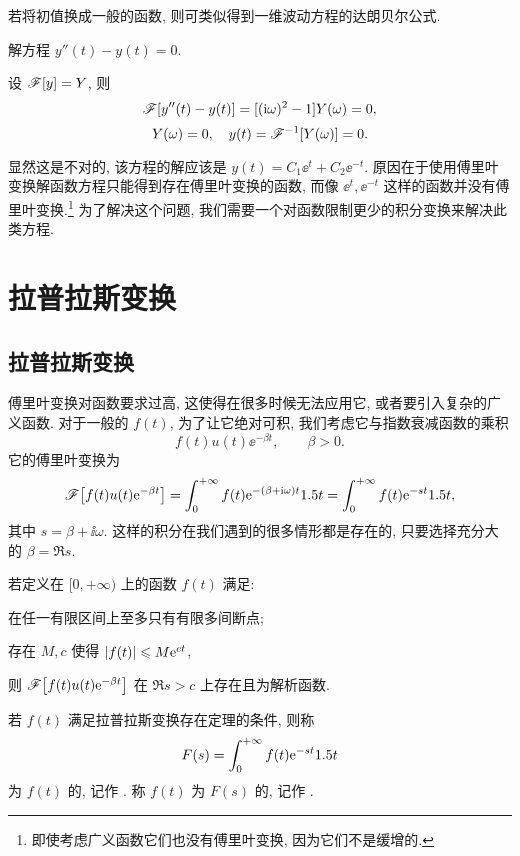 若将初值换成一般的函数, 则可类似得到一维波动方程的达朗贝尔公式.

\begin{example}
  \label{exam:second-ode}
  解方程 $y''(t)-y(t)=0$.
\end{example}

\begin{solution}
  设 $\mathscr{F}[y]=Y$, 则
  \[
    \mathscr{F}[y''(t)-y(t)]=[(\mathrm{i} \omega)^2-1]Y(\omega)=0,
  \]
  \[Y(\omega)=0,\quad y(t)=\mathscr{F}^{-1}[Y(\omega)]=0.\]
\end{solution}

显然这是不对的, 该方程的解应该是 $y(t)=C_1\ee^t+C_2\ee^{-t}$.
原因在于使用傅里叶变换解函数方程只能得到存在傅里叶变换的函数, 而像 $\ee^t,\ee^{-t}$ 这样的函数并没有傅里叶变换.\footnote{
  即使考虑广义函数它们也没有傅里叶变换, 因为它们不是缓增的.
}
为了解决这个问题, 我们需要一个对函数限制更少的积分变换来解决此类方程.



\section{拉普拉斯变换}

\subsection{拉普拉斯变换}

傅里叶变换对函数要求过高, 这使得在很多时候无法应用它, 或者要引入复杂的广义函数.
对于一般的 $f(t)$, 为了让它绝对可积, 我们考虑它与指数衰减函数的乘积
\[
  f(t)u(t)\ee^{-\beta t},\qquad\beta>0.
\]
它的傅里叶变换为
\[
   \mathscr{F}\bigl[f(t)u(t)\mathrm{e}^{-\beta t}\bigr]
  =\displaystyle\int_0^{+\infty} f(t)\mathrm{e}^{-(\beta+\mathrm{i} \omega)t}1.5 t
  =\displaystyle\int_0^{+\infty} f(t)\mathrm{e}^{-st}1.5 t,
\]
其中 $s=\beta+\ii \omega$.
这样的积分在我们遇到的很多情形都是存在的, 只要选择充分大的 $\beta=\Re s$.

\begin{theorem}[拉普拉斯变换存在定理]
  若定义在 $[0,+\infty)$ 上的函数 $f(t)$ 满足:
  \begin{enuma}[labelindent=.5em]
    \item 在任一有限区间上至多只有有限多间断点;
    \item 存在 $M,c$ 使得 $\lvert f(t)\rvert\leqslant M\mathrm{e}^{ct}$,
  \end{enuma}
  则 $\mathscr{F}\bigl[f(t)u(t)\mathrm{e}^{-\beta t}\bigr]$ 在 $\Re s>c$ 上存在且为解析函数.
\end{theorem}

\begin{definition}
  若 $f(t)$ 满足拉普拉斯变换存在定理的条件, 则称
  \[
    F(s)=\displaystyle\int_0^{+\infty} f(t)\mathrm{e}^{-st}1.5 t
  \]
  为 $f(t)$ 的, 记作 \nouns{$\msl[f(t)]$}.
  称 $f(t)$ 为 $F(s)$ 的, 记作 .
\end{definition}

